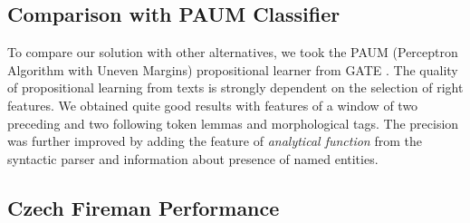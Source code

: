 \subsection{Comparison with PAUM Classifier} \label{sec:learning_eval_PAUM}
To compare our solution with other alternatives, we took the PAUM (Perceptron Algorithm with Uneven Margins) propositional learner from GATE \citep{Li:Paum}. The quality of propositional learning from texts is strongly dependent on the selection of right features. We obtained quite good results with features of a window of two preceding and two following token lemmas and morphological tags. The precision was further improved by adding the feature of \emph{analytical function} from the syntactic parser and information about presence of named entities.




\subsection{Czech Fireman Performance}

